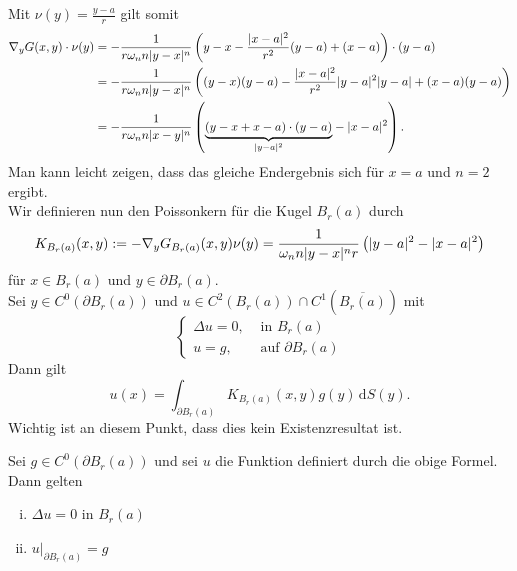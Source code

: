 	Mit $\nu(y)= \frac{y-a}{r}$ gilt somit
	\begin{align*}
		 \nabla_y G(x,y) \cdot \nu(y) &= - \frac{1}{r \omega_n n \lvert y-x\rvert^n} \left( y -x - \frac{\lvert x-a\rvert^2}{r^2}(y-a) + (x-a) \right) \cdot (y-a) \\
		 &= - \frac{1}{r \omega_n n \lvert y-x\rvert^n} \left( (y-x)(y-a) - \frac{\lvert x-a\rvert^2}{r^2} \lvert y-a\rvert^2 \lvert y-a\rvert + (x-a)(y-a) \right) \\
		 &= - \frac{1}{r \omega_n n \lvert x-y\rvert^n} \left( \underset{\lvert y-a\rvert^2}{\underbrace{(y-x+x-a) \cdot (y-a)}} - \lvert x-a\rvert^2 \right).
	\end{align*}
	Man kann leicht zeigen, dass das gleiche Endergebnis sich für $x=a$ und $n = 2$ ergibt. \\
	Wir definieren nun den Poissonkern für die Kugel $B_r(a)$ durch
	\[
		K_{B_r(a)}(x,y) := -  \nabla_y G_{B_r(a)}(x,y) \nu (y) = \frac{1}{\omega_n n \lvert y-x\rvert^n r} \left( \lvert y-a\rvert^2 - \lvert x-a\rvert^2 \right)
	\]
	für $x \in B_r(a)$ und $y \in \partial B_r(a)$. \\
	Sei $y \in C^0(\partial B_r(a))$ und $u \in C^2(B_r(a)) \cap C^1( \overline{B_r(a)})$ mit 
	\[
		\begin{cases}
			\Delta u = 0, &\text{ in }B_r(a)\\
			 u = g, &\text{ auf } \partial B_r(a)
		\end{cases}
	\]
	Dann gilt
	\[
		u(x) = \int_{\partial B_r(a) }^{} K_{B_r(a)}(x,y)g(y) \,\mathrm{d}S(y).
	\]
	Wichtig ist an diesem Punkt, dass dies kein Existenzresultat ist.
	\begin{satz}
		Sei $g \in C^0(\partial B_r(a))$ und sei $u$ die Funktion definiert durch die obige Formel. Dann gelten
		\begin{enumerate}[(i)]
			\item $ \Delta u = 0$ in $B_r(a)$
			\item $u  \Big|_{\partial B_r(a)}^{} = g$ 
		\end{enumerate}
	\end{satz}
